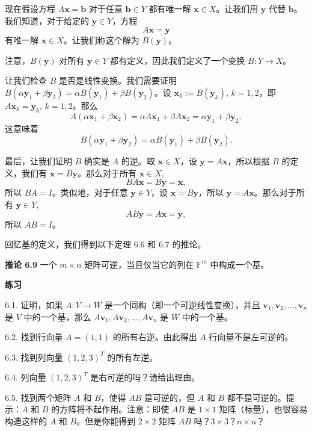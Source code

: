 现在假设方程 $A \mathbf{x} = \mathbf{b}$ 对于任意 $\mathbf{b} \in Y$ 都有唯一解 $\mathbf{x} \in X$。让我们用 $\mathbf{y}$ 代替 $\mathbf{b}$。我们知道，对于给定的 $\mathbf{y} \in Y$，方程 
$$A \mathbf{x} = \mathbf{y}$$
有唯一解 $\mathbf{x} \in X$。让我们称这个解为 $B(\mathbf{y})$。

注意，$B(\mathbf{y})$ 对所有 $\mathbf{y} \in Y$ 都有定义，因此我们定义了一个变换 $B: Y \to X$。

让我们检查 $B$ 是否是线性变换。我们需要证明 $B(\alpha \mathbf{y}_1 + \beta \mathbf{y}_2) = \alpha B(\mathbf{y}_1) + \beta B(\mathbf{y}_2)$。设 $\mathbf{x}_k := B(\mathbf{y}_k)$, $k = 1, 2$，即
$A \mathbf{x}_k = \mathbf{y}_k$, $k = 1, 2$。那么
$$A(\alpha \mathbf{x}_1 + \beta \mathbf{x}_2) = \alpha A \mathbf{x}_1 + \beta A \mathbf{x}_2 = \alpha \mathbf{y}_1 + \beta \mathbf{y}_2,$$
这意味着
$$B(\alpha \mathbf{y}_1 + \beta \mathbf{y}_2) = \alpha B(\mathbf{y}_1) + \beta B(\mathbf{y}_2).$$

最后，让我们证明 $B$ 确实是 $A$ 的逆。取 $\mathbf{x} \in X$，设 $\mathbf{y} = A \mathbf{x}$，所以根据 $B$ 的定义，我们有 $\mathbf{x} = B \mathbf{y}$。那么对于所有 $\mathbf{x} \in X$, 
$$BA \mathbf{x} = B \mathbf{y} = \mathbf{x},$$
所以 $BA = I$。类似地，对于任意 $\mathbf{y} \in Y$，设 $\mathbf{x} = B \mathbf{y}$，所以 $\mathbf{y} = A \mathbf{x}$。那么对于所有 $\mathbf{y} \in Y$,
$$AB \mathbf{y} = A \mathbf{x} = \mathbf{y},$$
所以 $AB = I$。

回忆基的定义，我们得到以下定理 6.6 和 6.7 的推论。

\textbf{推论 6.9} 一个 $m \times n$ 矩阵可逆，当且仅当它的列在 $\mathbb{F}^m$ 中构成一个基。

\textbf{练习}~

6.1. 证明，如果 $A: V \to W$ 是一个同构（即一个可逆线性变换），并且 $\mathbf{v}_1, \mathbf{v}_2, \dots, \mathbf{v}_n$ 是 $V$ 中的一个基，那么 $A \mathbf{v}_1, A \mathbf{v}_2, \dots, A \mathbf{v}_n$ 是 $W$ 中的一个基。

6.2. 找到行向量 $A = (1, 1)$ 的所有右逆。由此得出 $A$ 行向量不是左可逆的。

6.3. 找到列向量 $(1, 2, 3)^T$ 的所有左逆。

6.4. 列向量 $(1, 2, 3)^T$ 是右可逆的吗？请给出理由。

6.5. 找到两个矩阵 $A$ 和 $B$，使得 $AB$ 是可逆的，但 $A$ 和 $B$ 都不是可逆的。提示：$A$ 和 $B$ 的方阵将不起作用。注意：即使 $AB$ 是 $1 \times 1$ 矩阵（标量），也很容易构造这样的 $A$ 和 $B$。但是你能得到 $2 \times 2$ 矩阵 $AB$ 吗？$3 \times 3$？$n \times n$？

